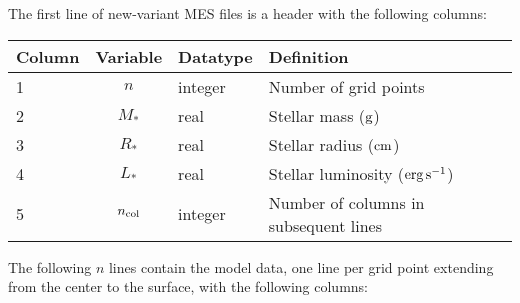 \documentclass{article}
\newcommand{\Rstar}{\ensuremath{R_{\ast}}}
\newcommand{\Mstar}{\ensuremath{M_{\ast}}}
\newcommand{\Lstar}{\ensuremath{L_{\ast}}}
\newcommand{\cm}{\ensuremath{{\rm cm}}}
\newcommand{\gram}{\ensuremath{{\rm g}}}
\newcommand{\second}{\ensuremath{{\rm s}}}
\newcommand{\erg}{\ensuremath{{\rm erg}}}
\begin{document}
The first line of new-variant MES files is a header with the following
columns:

\begin{table}[h!]
\begin{tabular}{|l|c|l|l|} \hline
Column & Variable & Datatype & Definition \\ \hline
1      & $n$ & integer & Number of grid points \\
2      & \Mstar & real & Stellar mass ($\gram$) \\
3      & \Rstar & real & Stellar radius ($\cm$) \\
4      & \Lstar & real & Stellar luminosity ($\erg\,\second^{-1}$) \\
5      & $n_{\rm col}$ & integer & Number of columns in subsequent lines \\ \hline
\end{tabular}
\end{table}

The following $n$ lines contain the model data, one line per
grid point extending from the center to the surface, with the following columns:
\end{document}
